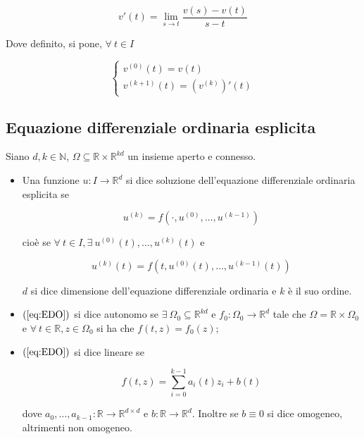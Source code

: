 \documentclass[hidelinks, 10pt]{report}
\begin{document}
\[ v'(t) = \lim\limits_{s \to t} \frac{v(s) - v(t)}{s - t} \]

Dove definito, si pone, $ \forall\ t \in I $

\[
\begin{cases}
v^{(0)}(t) = v(t) \\
v^{(k + 1)}(t) = (v^{(k)})' (t) 
\end{cases}
\]

\subsection{Equazione differenziale ordinaria esplicita}
Siano $ d, k \in \mathbb{N} $, $ \Omega \subseteq \mathbb{R} \times \mathbb{R}^{kd} $ un insieme aperto e connesso.

\begin{itemize}
\item Una funzione $ u: I \to \mathbb{R}^{d} $ si dice soluzione dell'equazione differenziale ordinaria esplicita se

\[
u^{(k)} = f \left( \cdot, u^{(0)}, \dotsc, u^{(k - 1)} \right)
\]

cio\`e se $ \forall\ t \in I, \exists\ u^{(0)}(t), \dotsc, u^{(k)}(t) $ e 

\begin{equation}	\label{eq:EDO}
u^{(k)}(t) = f \left( t, u^{(0)}(t), \dotsc, u^{(k - 1)}(t) \right)
\end{equation}

$ d $ si dice dimensione dell'equazione differenziale ordinaria e $ k $ \`e il suo ordine.

\item $ (\ref{eq:EDO}) $ si dice autonomo se $ \exists\ \Omega_{0} \subseteq \mathbb{R}^{kd} $ e $ f_{0}: \Omega_{0} \to \mathbb{R}^{d} $ tale che $ \Omega = \mathbb{R} \times \Omega_{0} $ e $ \forall\ t \in \mathbb{R}, z \in \Omega_{0} $ si ha che $ f(t, z) = f_{0} (z) $;
\item $ (\ref{eq:EDO}) $ si dice lineare se 

\[ f(t, z) = \sum\limits_{i = 0}^{k - 1} a_{i} (t) z_{i} + b(t) \]

dove $ a_{0}, \dotsc, a_{k - 1}: \mathbb{R} \to \mathbb{R}^{d \times d} $ e $ b: \mathbb{R} \to \mathbb{R}^{d} $. Inoltre se $ b \equiv 0 $ si dice omogeneo, altrimenti non omogeneo.
\end{itemize}
\end{document}
